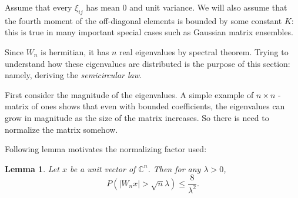 \documentclass[12pt,a4paper,leqno]{report}
\newcommand{\C}{\mathbb{C}}
\theoremstyle{plain}
\newtheorem{lem}[equation]{Lemma}
\theoremstyle{definition}
\theoremstyle{remark}
\begin{document}
Assume that every $\xi_{ij}$ has mean $0$ and unit variance. We will also assume that the fourth moment of the off-diagonal elements is bounded by some constant $K$: this is true in many important special cases such as Gaussian matrix ensembles.

Since $W_n$ is hermitian, it has $n$ real eigenvalues by spectral theorem.
Trying to understand how these eigenvalues are distributed is the purpose of this section: namely, deriving the \emph{semicircular law}.

First consider the magnitude of the eigenvalues. A simple example of $n \times n$ -matrix of ones shows that even with bounded coefficients, the eigenvalues can grow in magnitude as the size of the matrix increases. So there is need to normalize the matrix somehow.

Following lemma motivates the normalizing factor used:

\begin{lem}
Let $x$ be a unit vector of $\C^n$. Then for any $\lambda > 0$, 
\begin{equation*}
P(|W_nx|>\sqrt{n}\lambda) \leq \frac{8}{\lambda^2}.
\end{equation*}
\end{lem}
\end{document}
